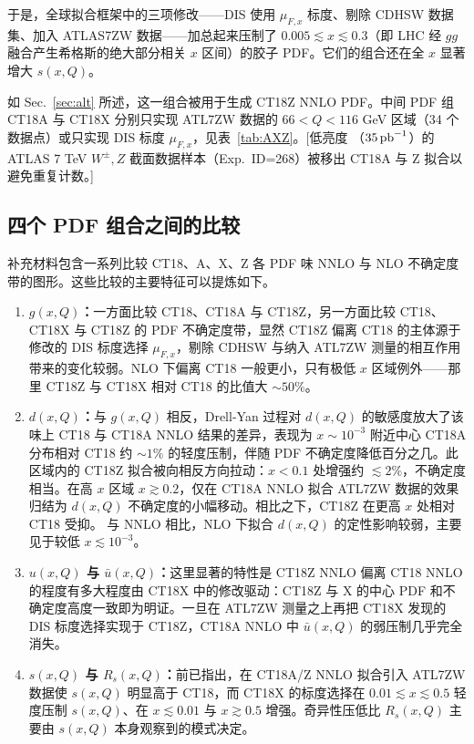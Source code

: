 于是，全球拟合框架中的三项修改——DIS 使用 $\mu_{F,x}$ 标度、剔除 CDHSW 数据集、加入 ATLAS7ZW 数据——加总起来压制了 $0.005 \lesssim x \lesssim 0.3$（即 LHC 经 $gg$ 融合产生希格斯的绝大部分相关 $x$ 区间）的胶子 PDF。它们的组合还在全 $x$ 显著增大 $s(x,Q)$。

如 Sec.~\ref{sec:alt} 所述，这一组合被用于生成 CT18Z NNLO PDF。中间 PDF 组 CT18A 与 CT18X 分别只实现 ATL7ZW 数据的 $66 < Q < 116$ GeV 区域（34
个数据点）或只实现 DIS 标度 $\mu_{F,x}$，见表~\ref{tab:AXZ}。[低亮度
（$35\, {\rm pb}^{-1}$）的 ATLAS 7 TeV $W^\pm,Z$
截面数据样本（Exp.~ID=268）被移出 CT18A 与 Z 拟合以避免重复计数。]

\subsection{四个 PDF 组合之间的比较}
\label{sec:CT18ZvsCT18}

补充材料包含一系列比较 CT18、A、X、Z 各 PDF 味 NNLO 与 NLO 不确定度带的图形。这些比较的主要特征可以提炼如下。

\begin{enumerate}
\item {\bf $g(x,Q)$：}一方面比较 CT18、CT18A 与 CT18Z，另一方面比较 CT18、CT18X 与 CT18Z 的 PDF 不确定度带，显然 CT18Z 偏离 CT18 的主体源于修改的 DIS 标度选择 $\mu_{F,x}$，剔除 CDHSW 与纳入 ATL7ZW 测量的相互作用带来的变化较弱。NLO 下偏离 CT18 一般更小，只有极低 $x$ 区域例外——那里 CT18Z 与 CT18X 相对 CT18 的比值大 $\sim\! 50\%$。
%
\item {\bf $d(x,Q)$：}与 $g(x,Q)$ 相反，Drell-Yan 过程对 $d(x,Q)$ 的敏感度放大了该味上 CT18 与 CT18A NNLO 结果的差异，表现为 $x\!\sim\!10^{-3}$ 附近中心 CT18A 分布相对 CT18 约 $\sim\!1\%$ 的轻度压制，伴随 PDF 不确定度降低百分之几。此区域内的 CT18Z 拟合被向相反方向拉动：$x\!<\! 0.1$ 处增强约 $\lesssim\!2\%$，不确定度相当。在高 $x$ 区域
$x \gtrsim 0.2$，仅在 CT18A NNLO 拟合 ATL7ZW 数据的效果归结为 $d(x,Q)$ 不确定度的小幅移动。相比之下，CT18Z 在更高 $x$ 处相对 CT18 受抑。
与 NNLO 相比，NLO 下拟合 $d(x,Q)$ 的定性影响较弱，主要见于较低 $x\!\lesssim\!
10^{-3}$。
%
\item {\bf $u(x,Q)$ 与 $\bar u(x,Q)$：}这里显著的特性是 CT18Z NNLO 偏离 CT18 NNLO 的程度有多大程度由 CT18X 中的修改驱动：CT18Z 与 X 的中心 PDF 和不确定度高度一致即为明证。一旦在 ATL7ZW 测量之上再把 CT18X 发现的 DIS 标度选择实现于 CT18Z，CT18A NNLO 中 $\bar{u}(x,Q)$ 的弱压制几乎完全消失。
\item {\bf $s(x,Q)$ 与 $R_s(x,Q)$：}前已指出，在 CT18A/Z NNLO 拟合引入 ATL7ZW 数据使 $s(x,Q)$ 明显高于 CT18，而 CT18X 的标度选择在 $0.01 \lesssim x \lesssim 0.5$ 轻度压制 $s(x,Q)$、在 $x \lesssim 0.01$ 与 $x \gtrsim 0.5$ 增强。奇异性压低比 $R_s(x,Q)$ 主要由 $s(x,Q)$ 本身观察到的模式决定。
\end{enumerate}


